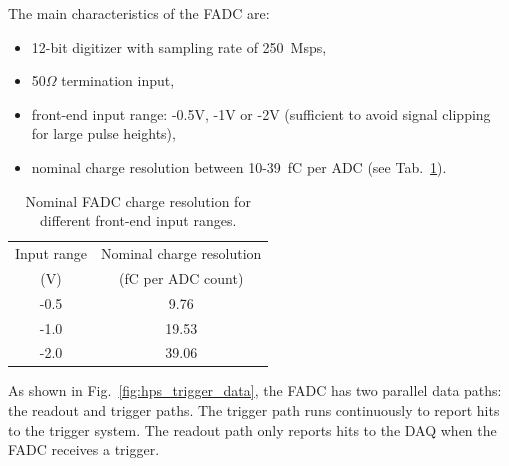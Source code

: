 
The main characteristics of the FADC are:
\begin{itemize}
\item 12-bit digitizer with sampling rate of 250~Msps, 
\item 50$\Omega$ termination input, 
\item front-end input range:  -0.5V, -1V or -2V (sufficient to avoid signal clipping for large pulse heights),
\item nominal charge resolution between 10-39~fC per ADC (see Tab.~\ref{tab:charge_resolution}).
\end{itemize}
\begin{table}[h]
\centering
\begin{tabular}{|c|c|}
\hline
Input range & Nominal charge resolution\\
(V) & (fC per ADC count)\\\hline
-0.5 & 9.76  \\\hline
-1.0 & 19.53  \\\hline
-2.0 & 39.06 \\\hline
\end{tabular}
\caption{Nominal FADC charge resolution for different front-end input ranges.}
\label{tab:charge_resolution}
\end{table}
As shown in Fig.~\ref{fig:hps_trigger_data}, the FADC has two parallel data paths: the readout and trigger paths. The trigger path runs continuously to report hits to the trigger system. The readout path only reports hits to the DAQ when the FADC receives a trigger.

